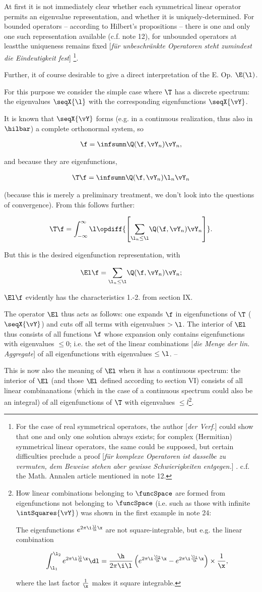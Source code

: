\documentclass{article}
\newcommand{\WTF}[1]{
[\it{\small{#1}}]
}
\newcommand{\uequ}[1]{
\begin{align*}
#1
\end{align*}
}
\newcommand{\const}[1]{#1}
\newcommand{\inv}[1]{\frac{1}{#1}}
\renewcommand{\it}[1]{\textit{#1}}
\newcommand{\sumX}[1]{\underset{#1}{\sum}}
\newcommand{\intXY}[2]{\int_{#1}^{#2}}
\renewcommand{\exp}[1]{\const{e}^{#1}}
\begin{document}
At first it is not immediately clear whether each symmetrical linear operator permits an eigenvalue representation, and whether it is uniquely-determined. For bounded operators -- according to Hilbert's propositions -- there is one and only one such representation available (c.f. note 12), for unbounded operators at leastthe uniqueness remains fixed\WTF{für unbeschränkte Operatoren steht zumindest die Eindeutigkeit fest}\footnote{For the case of real symmetrical operators, the author\WTF{der Verf.} could show that one and only one solution always exists; for complex (Hermitian) symmetrical linear operators, the same could be supposed, but certain difficulties preclude a proof\WTF{für komplexe Operatoren ist dasselbe zu vermuten, dem Beweise stehen aber gewisse Schwierigkeiten entgegen.}. c.f. the Math. Annalen article mentioned in note 12.}.

Further, it of course desirable to give a direct interpretation of the E. Op. $\E(\l)$.

For this purpose we consider the simple case where $\T$ has a discrete spectrum: the eigenvalues $\seqX{\l}$ with the corresponding eigenfunctions $\seqX{\vY}$.

It is known that $\seqX{\vY}$ forms (e.g. in a continuous realization, thus also in $\hilbar$) a complete orthonormal system, so
\uequ{
\f = \infsumn\Q(\f,\vY_n)\vY_n,
}
and because they are eigenfunctions,
\uequ{
\T\f = \infsumn\Q(\f,\vY_n)\l_n\vY_n
}
(because this is merely a preliminary treatment, we don't look into the questions of convergence). From this follows further:
\uequ{
\T\f = \intXY{-\infty}{\infty}\l\opdiff{\left[
\sumX{\l_n \leq \l} \Q(\f,\vY_n)\vY_n
\right]}.
}
But this is the desired eigenfunction representation, with
\uequ{
\El\f = \sumX{\l_n \leq \l}\Q(\f,\vY_n)\vY_n;
}
$\El\f$ evidently has the characteristics 1.-2. from section IX.

The operator $\El$ thus acts as follows: one expands $\f$ in eigenfunctions of $\T$ ($\seqX{\vY}$) and cuts off all terms with eigenvalues $> \l$. The interior of $\El$ thus consists of all functions $\f$ whose expansion only contains eigenfunctions with eigenvalues $\leq 0$; i.e. the set of the linear combinations\WTF{die Menge der lin. Aggregate} of all eigenfunctions with eigenvalues $\leq \l$. --

This is now also the meaning of $\El$ when it has a continuous spectrum: the interior of $\El$ (and those $\El$ defined according to section VI) consists of all linear combinanations (which in the case of a continuous spectrum could also be an integral) of all eigenfunctions of $\T$ with eigenvalues $\leq l$\footnote{How linear combinations belonging to $\funcSpace$ are formed from eigenfunctions not belonging to $\funcSpace$ (i.e. such as those with infinite $\intSquares{\vY}$) was shown in the first example in note 24:

The eigenfunctions $\exp{2\pi\i\frac{\l}{\h}\x}$ are not square-integrable, but e.g. the linear combination
\uequ{
\intXY{\l_1}{\l_2}\exp{2\pi\i\frac{\l}{\h}\x}\dl = \frac{\h}{2\pi\i\l}\left(
\exp{2\pi\i\frac{\l_2}{\h}\x} - \exp{2\pi\i\frac{\l_1}{\h}\x}
\right)\times\inv{\x},
}
where the last factor $\inv{\x}$ makes it square integrable.
}.
\end{document}
